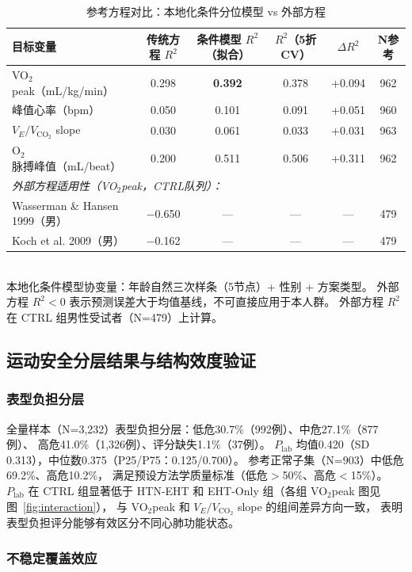 \documentclass[12pt, a4paper]{ctexart}
\begin{document}
\begin{table}[htbp]
\centering
\small
\caption{参考方程对比：本地化条件分位模型 vs 外部方程}
\label{tab:refequations_v2}
\begin{tabular}{lccccc}
\toprule
目标变量 & 传统方程 $R^2$ & 条件模型 $R^2$（拟合）& $R^2$（5折CV）& $\Delta R^2$ & N参考 \\
\midrule
VO$_2$peak（mL/kg/min）& 0.298 & \textbf{0.392} & 0.378 & +0.094 & 962 \\
峰值心率（bpm）& 0.050 & 0.101 & 0.091 & +0.051 & 960 \\
$V_E/V_{\text{CO}_2}$ slope & 0.030 & 0.061 & 0.033 & +0.031 & 963 \\
O$_2$脉搏峰值（mL/beat）& 0.200 & 0.511 & 0.506 & +0.311 & 962 \\
\midrule
\multicolumn{6}{l}{\textit{外部方程适用性（VO$_2$peak，CTRL队列）：}} \\
Wasserman \& Hansen 1999（男）& $-$0.650 & — & — & — & 479 \\
Koch et al. 2009（男）& $-$0.162 & — & — & — & 479 \\
\bottomrule
\end{tabular}
\\[1ex]
{\footnotesize 本地化条件模型协变量：年龄自然三次样条（5节点）+ 性别 + 方案类型。
外部方程 $R^2<0$ 表示预测误差大于均值基线，不可直接应用于本人群。
外部方程 $R^2$ 在 CTRL 组男性受试者（N=479）上计算。}
\end{table}

\subsection{运动安全分层结果与结构效度验证}

\subsubsection{表型负担分层}

全量样本（N=3,232）表型负担分层：低危30.7\%（992例）、中危27.1\%（877例）、
高危41.0\%（1,326例）、评分缺失1.1\%（37例）。
$P_{\text{lab}}$ 均值0.420（SD 0.313），中位数0.375（P25/P75：0.125/0.700）。
参考正常子集（N=903）中低危69.2\%、高危10.2\%，
满足预设方法学质量标准（低危$>$50\%、高危$<$15\%）。
$P_{\text{lab}}$ 在 CTRL 组显著低于 HTN-EHT 和 EHT-Only 组（各组 VO$_2$peak 图见图~\ref{fig:interaction}），
与 VO$_2$peak 和 $V_E/V_{\text{CO}_2}$ slope 的组间差异方向一致，
表明表型负担评分能够有效区分不同心肺功能状态。

\subsubsection{不稳定覆盖效应}
\end{document}
